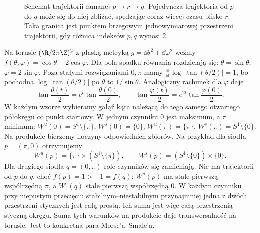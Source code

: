 \begin{figure}[H]
\centering
{}
\caption{Schemat trajektorii łamanej $p\to r\to q$.
Pojedyncza trajektoria od $p$ do $q$
może się do niej zbliżać, spędzając
coraz więcej czasu blisko $r$.
Taka granica jest punktem brzegowym
jednowymiarowej przestrzeni trajektorii,
gdy różnica indeksów $p,q$ wynosi $2$.}
\label{fig:lamane-trajektorie-morse-17}
\end{figure}

\begin{przyklad}
\label{prz:morse-smale-produkt-22}
Na torusie $(\R/2\pi\Z)^2$ z płaską metryką
$g=\dd\theta^2+\dd\varphi^2$ weźmy
$f(\theta,\varphi)=\cos\theta+2\cos\varphi$.
Dla pola spadku równania rozdzielają się:
$\dot\theta=\sin\theta$, $\dot\varphi=2\sin\varphi$.
Poza stałymi rozwiązaniami $0,\pi$ mamy
$\frac{\dd}{\dd t}\log|\tan(\theta/2)|=1$,
bo pochodna $\log|\tan(\theta/2)|$ po $\theta$ to $1/\sin\theta$.
Analogiczny rachunek dla $\varphi$ daje
\[
 \tan\frac{\theta(t)}2=e^t\tan\frac{\theta(0)}2,\qquad
 \tan\frac{\varphi(t)}2=e^{2t}\tan\frac{\varphi(0)}2.
\]
W każdym wzorze wybieramy gałąź kąta należącą do tego
samego otwartego półokręgu co punkt startowy.
W jednym czynniku $0$ jest maksimum, a $\pi$ minimum:
$W^u(0)=S^1\setminus\{\pi\}$, $W^s(0)=\{0\}$,
$W^u(\pi)=\{\pi\}$, $W^s(\pi)=S^1\setminus\{0\}$.
Na produkcie bierzemy iloczyny odpowiednich zbiorów.
Na przykład dla siodła $p=(\pi,0)$ otrzymujemy
\[
 W^u(p)=\{\pi\}\times(S^1\setminus\{\pi\}),\qquad
 W^s(p)=(S^1\setminus\{0\})\times\{0\}.
\]
Dla drugiego siodła $q=(0,\pi)$ role czynników się zamieniają.
Nie ma trajektorii od $p$ do $q$, choć $f(p)=1>-1=f(q)$:
$W^u(p)$ ma stale pierwszą współrzędną $\pi$,
a $W^s(q)$ stale pierwszą współrzędną $0$.
W każdym czynniku przy niepustym przecięciu stabilnym--niestabilnym
przynajmniej jedna z dwóch przestrzeni stycznych jest całą prostą.
Ich suma jest więc całą przestrzenią styczną okręgu.
Suma tych warunków na produkcie daje transwersalność na torusie.
Jest to konkretna para Morse'a--Smale'a.
\end{przyklad}

